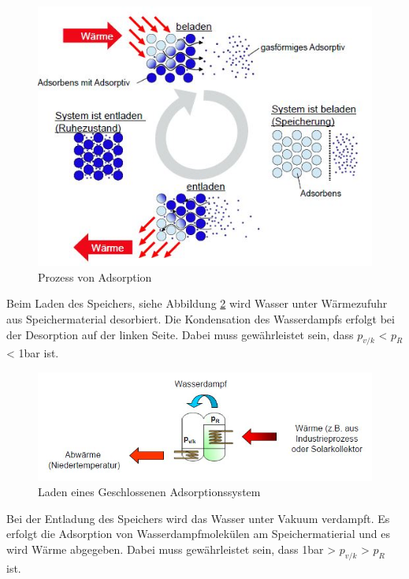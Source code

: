 \documentclass[11pt,a4paper]{scrartcl}
\begin{document}
\begin{figure}[h!]
\begin{center}
\includegraphics[scale=0.6]{images/prozess.jpg}
\caption{Prozess von Adsorption}
\label{fig:adsorption}
\end{center}
\end{figure}

Beim Laden des Speichers, siehe Abbildung \ref{fig:geschlossenerladen} wird
Wasser unter Wärmezufuhr aus Speichermaterial desorbiert. Die Kondensation des
Wasserdampfs erfolgt bei der Desorption auf der linken Seite.
Dabei muss gewährleistet sein, dass $p_{v/k}$ < $p_R$ < 1bar ist.

\begin{figure}[h!]
\begin{center}
\includegraphics[scale=0.6]{images/geschlossenerladen.jpg}
\caption{Laden eines Geschlossenen Adsorptionssystem \cite{zeosys}}
\label{fig:geschlossenerladen}
\end{center}
\end{figure}

Bei der Entladung des Speichers wird das Wasser unter Vakuum verdampft. Es
erfolgt die Adsorption von Wasserdampfmolekülen am Speichermatierial und es
wird Wärme abgegeben. Dabei muss gewährleistet sein, dass 1bar > $p_{v/k}$ >
$p_R$ ist.
\end{document}
